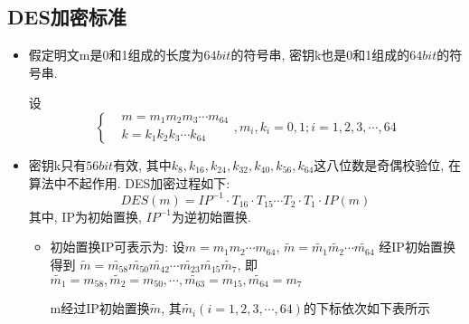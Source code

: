 \documentclass[UTF8]{ctexart}
\begin{document}
    \subsection{DES加密标准}
    \begin{itemize}
        \renewcommand{\labelitemi}{\scriptsize$\blacksquare$}
        \item 假定明文m是0和1组成的长度为$64bit$的符号串, 密钥k也是0和1组成的$64bit$的符号串.

        设
        $$
        \left\{ \begin{aligned}
            &m=m_1m_2m_3\cdots m_{64}\\
            &k=k_1k_2k_3\cdots k_{64}
        \end{aligned}\right.
        , m_i, k_i=0,1; i=1,2,3,\cdots, 64
        $$

        \item 密钥k只有$56bit$有效, 其中$k_8, k_{16}, k_{24}, k_{32}, k_{40}, k_{56}, k_{64}$这八位数是奇偶校验位, 在算法中不起作用. DES加密过程如下:
        $$DES(m)=IP^{-1}\cdot T_{16}\cdot T_{15}\cdots T_2\cdot T_1\cdot IP(m)$$
        其中, IP为初始置换, $IP^{-1}$为逆初始置换.
        \begin{itemize}
            \item 初始置换IP可表示为:
            设$m=m_1m_2\cdots m_{{64}}$, $\widetilde{m}=\widetilde{m_1}\widetilde{m_2}\cdots \widetilde{m_{64}}$
            经IP初始置换得到 $\widetilde{m}=\widetilde{m_{58}}\widetilde{m_{50}}\widetilde{m_{42}}\cdots \widetilde{m_{23}}\widetilde{m_{15}}\widetilde{m_7}$,
            即$\widetilde{m_1}=m_{58}, \widetilde{m_2}=m_{50}, \cdots, \widetilde{m_{63}}=m_{15}, \widetilde{m_{64}}=m_7$

            m经过IP初始置换$\widetilde{m}$, 其$\widetilde{m_i}(i=1,2,3,\cdots, 64)$的下标依次如下表所示


\end{itemize}
\end{itemize}
\end{document}
